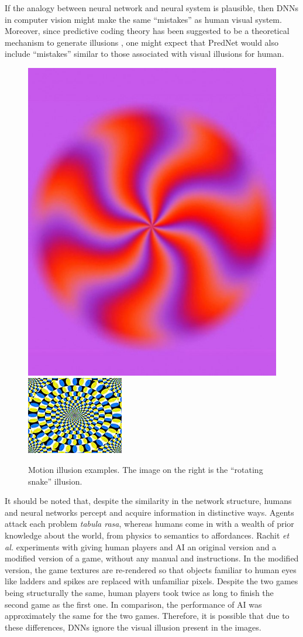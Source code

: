 \documentclass[journal]{IEEEtran}
\begin{document}
  If the analogy between neural network and neural system is plausible, then DNNs in computer vision might make the same ``mistakes'' as human visual system. Moreover, since predictive coding theory has been suggested to be a theoretical mechanism to generate illusions \cite{notredame2014visual}, one might expect that PredNet would also include ``mistakes'' similar to those associated with visual illusions for human.
  
  \begin{figure}[t]
    \centering
    \includegraphics[width=0.48\linewidth]{fig/illusion_eg.jpg}
    \includegraphics[width=0.48\linewidth]{fig/rotate-0.png}
    \caption{Motion illusion examples. The image on the right is the ``rotating snake'' illusion.}
    \label{fig:motion_example}
  \end{figure}
  
  It should be noted that, despite the similarity in the network structure, humans and neural networks percept and acquire information in distinctive ways. Agents attack each problem \textit{tabula rasa}, whereas humans come in with a wealth of prior knowledge about the world, from physics to semantics to affordances. Rachit \textit{et al.} \cite{dubey2018investigating} experiments with giving human players and AI an original version and a modified version of a game, without any manual and instructions. In the modified version, the game textures are re-rendered so that objects familiar to human eyes like ladders and spikes are replaced with unfamiliar pixels. Despite the two games being structurally the same, human players took twice as long to finish the second game as the first one. In comparison, the performance of AI was approximately the same for the two games. Therefore, it is possible that due to these differences, DNNs ignore the visual illusion present in the images.
  
\end{document}
